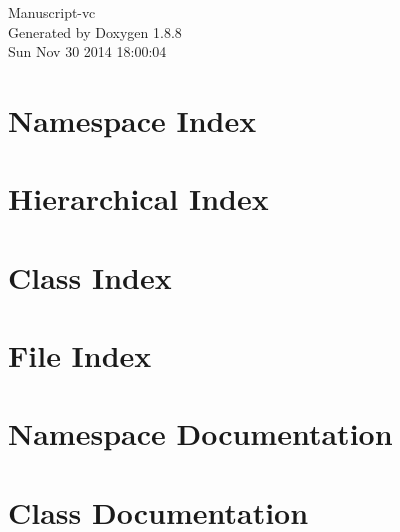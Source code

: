 \documentclass[twoside]{book}
\newcommand{\+}{\discretionary{\mbox{\scriptsize$\hookleftarrow$}}{}{}}
\newcommand{\clearemptydoublepage}{%
  \newpage{\pagestyle{empty}\cleardoublepage}%
}
\begin{document}
\hypersetup{pageanchor=false,
             bookmarks=true,
             bookmarksnumbered=true,
             pdfencoding=unicode
            }
\begin{titlepage}
\vspace*{7cm}
\begin{center}%
{\Large Manuscript-\/vc }\\
\vspace*{1cm}
{\large Generated by Doxygen 1.8.8}\\
\vspace*{0.5cm}
{\small Sun Nov 30 2014 18:00:04}\\
\end{center}
\end{titlepage}
\clearemptydoublepage
\tableofcontents
\clearemptydoublepage
{}
\hypersetup{pageanchor=true}

\chapter{Namespace Index}

\chapter{Hierarchical Index}

\chapter{Class Index}

\chapter{File Index}

\chapter{Namespace Documentation}

\chapter{Class Documentation}































\end{document}
